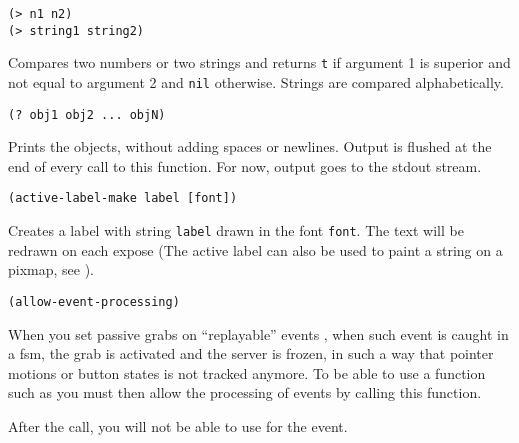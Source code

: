         
{\usagefont\begin{verbatim}
(> n1 n2)
(> string1 string2)
\end{verbatim}}\usageupspace

Compares two numbers or two strings and returns \verb"t" if argument 1 is
superior and not equal to argument 2 and \verb"nil" otherwise. Strings are
compared alphabetically.

        
{\usagefont\begin{verbatim}
(? obj1 obj2 ... objN)
\end{verbatim}}\usageupspace

Prints the objects, without adding spaces or newlines. Output is flushed at
the end of every call to this function. For now, output goes to the stdout
stream.

        
{\usagefont\begin{verbatim}
(active-label-make label [font])
\end{verbatim}}\usageupspace

Creates a label with string \verb|label| drawn
in the font \verb"font". The text will be redrawn on each expose (The
active label can also be used to paint a string on a pixmap, see
).



{\usagefont\begin{verbatim}
(allow-event-processing)
\end{verbatim}}\usageupspace

When you set passive grabs on ``replayable'' events ,
when such event is caught in a fsm, the grab is activated and the server is
frozen, in such a way that pointer motions or button states is not tracked
anymore. To be able to use a function such as 
you must then allow the processing of events by calling this function.

After the call, you will not be able to use
 for the event.

